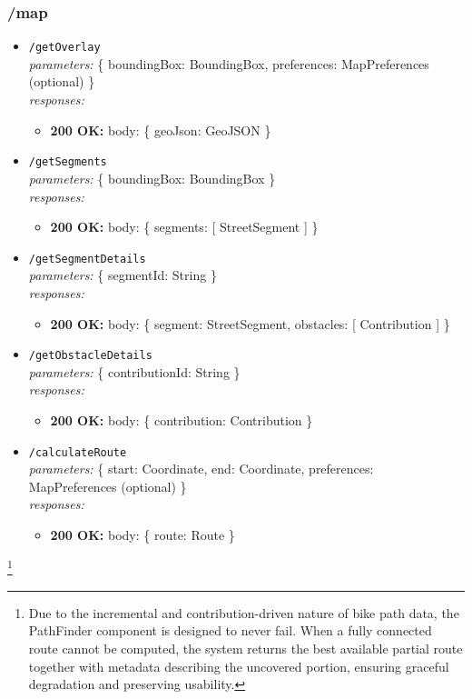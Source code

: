 \subsubsection*{/map}

\begin{itemize}
    \item \texttt{/getOverlay} \\
    \textit{parameters:} \{ boundingBox: BoundingBox, preferences: MapPreferences (optional) \} \\
    \textit{responses:}
    \begin{itemize}
        \item \textbf{200 OK:} body: \{ geoJson: GeoJSON \}
    \end{itemize}

    \item \texttt{/getSegments} \\
    \textit{parameters:} \{ boundingBox: BoundingBox \} \\
    \textit{responses:}
    \begin{itemize}
        \item \textbf{200 OK:} body: \{ segments: [ StreetSegment ] \}
    \end{itemize}

    \item \texttt{/getSegmentDetails} \\
    \textit{parameters:} \{ segmentId: String \} \\
    \textit{responses:}
    \begin{itemize}
        \item \textbf{200 OK:} body: \{ segment: StreetSegment, obstacles: [ Contribution ] \}
    \end{itemize}

    \item \texttt{/getObstacleDetails} \\
    \textit{parameters:} \{ contributionId: String \} \\
    \textit{responses:}
    \begin{itemize}
        \item \textbf{200 OK:} body: \{ contribution: Contribution \}
    \end{itemize}

    \item \texttt{/calculateRoute} \\
    \textit{parameters:} \{ start: Coordinate, end: Coordinate, preferences: MapPreferences (optional) \} \\
    \textit{responses:}
    \begin{itemize}
        \item \textbf{200 OK:} body: \{ route: Route \}
    \end{itemize}
\end{itemize}
\footnote{
Due to the incremental and contribution-driven nature of bike path data, the PathFinder component is designed to never fail. When a fully connected route cannot be computed, the system returns the best available partial route together with metadata describing the uncovered portion, ensuring graceful degradation and preserving usability.
}
